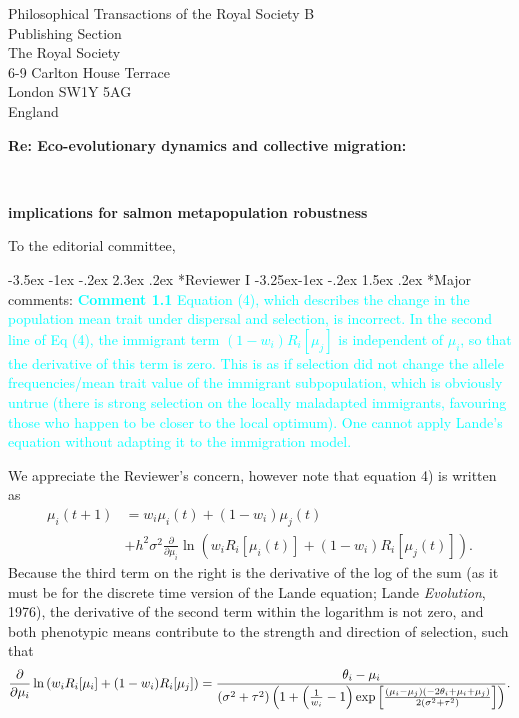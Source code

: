 \documentclass[ucm,12pt]{ucletter}
\makeatletter
\newcounter{section}
\newcounter{subsection}[section]
\renewcommand\section{\@startsection {section}{1}{\z@}%
                                   {-3.5ex \@plus -1ex \@minus -.2ex}%
                                   {2.3ex \@plus.2ex}%
                                   {\normalfont\Large\bfseries}}
\newcommand\subsection{\@startsection{subsection}{2}{\z@}%
                                     {-3.25ex\@plus -1ex \@minus -.2ex}%
                                     {1.5ex \@plus .2ex}%
                                     {\normalfont\large\bfseries}}
\makeatother
\begin{document}
\begin{letter}{
    Philosophical Transactions of the Royal Society B\\
    Publishing Section\\
    The Royal Society\\
    6-9 Carlton House Terrace\\
    London SW1Y 5AG\\
    England\\
    \centerline{\bf{Re: Eco-evolutionary dynamics and collective migration:}}\\
     \centerline{\bf{implications for salmon metapopulation robustness}}
}


\opening{To the editorial committee,}


\section*{Reviewer I}
\subsection*{Major comments:}
\noindent \textcolor{cyan}{
{\bf Comment 1.1} Equation (4), which describes the change in the population mean trait under dispersal and selection, is incorrect. In the second line of Eq (4), the immigrant term $(1-w_i) R_i [\mu_j]$ is independent of $\mu_i$, so that the derivative of this term is zero. This is as if selection did not change the allele frequencies/mean trait value of the immigrant subpopulation, which is obviously untrue (there is strong selection on the locally maladapted immigrants, favouring those who happen to be closer to the local optimum). One cannot apply Lande's equation without adapting it to the immigration model.
}

 We appreciate the Reviewer's concern, however note that equation 4) is written as
\begin{align}
  \label{eq:mu}
  \mu_i(t+1) &= w_i\mu_i(t) + (1-w_i)\mu_j(t) \\ \nonumber
  &+ h^2\sigma^2\frac{\partial}{\partial \mu_i}\ln\left(w_i R_i[\mu_i(t)] + (1-w_i)R_i[\mu_j(t)]  \right).
\end{align}
Because the third term on the right is the derivative of the log of the sum (as it must be for the discrete time version of the Lande equation; Lande \emph{Evolution}, 1976), the derivative of the second term within the logarithm is not zero, and both phenotypic means contribute to the strength and direction of selection, such that
\begin{equation}
  \frac{\partial}{\partial \mu_i}\ln\left(w_i R_i[\mu_i] + (1-w_i)R_i[\mu_j]  \right) = \frac{\theta_i-\mu_i}{\left(\sigma ^2+\tau ^2\right) \left(1+\left(\frac{1}{w_i}-1\right) {\rm exp}\left[\frac{(\mu_i-\mu_j) (-2 \theta_i+\mu_i+\mu_j)}{2 \left(\sigma ^2+\tau ^2\right)}\right]\right)}.
\end{equation}



\end{letter}
\end{document}
